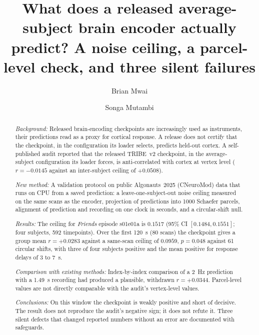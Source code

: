 \documentclass[preprint,12pt]{elsarticle}
\begin{document}
\begin{frontmatter}

\title{What does a released average-subject brain encoder actually predict? A noise
ceiling, a parcel-level check, and three silent failures}

\author[cuea]{Brian Mwai}
\author[cuea]{Songa Mutambi}

\begin{abstract}
\textit{Background:} Released brain-encoding checkpoints are increasingly used as instruments,
their predictions read as a proxy for cortical response. A release does not certify that the
checkpoint, in the configuration its loader selects, predicts held-out cortex. A
self-published audit reported that the released TRIBE~v2 checkpoint, in the average-subject
configuration its loader forces, is anti-correlated with cortex at vertex level
($r = -0.0145$ against an inter-subject ceiling of $+0.0508$).

\textit{New method:} A validation protocol on public Algonauts~2025 (CNeuroMod) data that runs
on CPU from a saved prediction: a leave-one-subject-out noise ceiling measured on the same
scans as the encoder, projection of predictions into 1000 Schaefer parcels, alignment of
prediction and recording on one clock in seconds, and a circular-shift null.

\textit{Results:} The ceiling for \emph{Friends} episode s01e01a is $0.1517$ (95\% CI
$[0.1484, 0.1551]$; four subjects, 592 timepoints). Over the first 120~s (80 scans) the
checkpoint gives a group mean $r = +0.0283$ against a same-scan ceiling of $0.0959$,
$p = 0.048$ against 61 circular shifts, with three of four subjects positive and the mean
positive for response delays of 3 to 7~s.

\textit{Comparison with existing methods:} Index-by-index comparison of a 2~Hz prediction with
a 1.49~s recording had produced a plausible, withdrawn $r = +0.0344$. Parcel-level values are
not directly comparable with the audit's vertex-level values.

\textit{Conclusions:} On this window the checkpoint is weakly positive and short of decisive.
The result does not reproduce the audit's negative sign; it does not refute it. Three silent
defects that changed reported numbers without an error are documented with safeguards.
\end{abstract}


\end{frontmatter}
\end{document}
